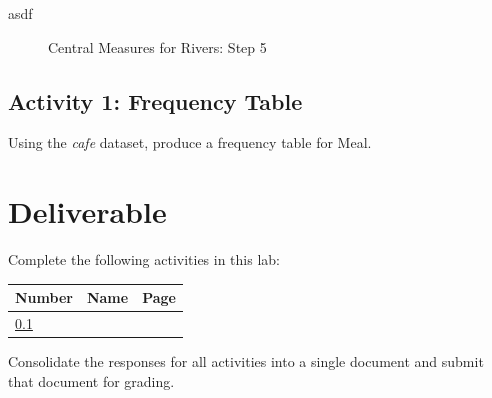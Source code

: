   asdf

\begin{figure}[H]
  \begin{center}
    \caption{Central Measures for Rivers: Step 5}
    \label{lab02_fig02}
  \end{center}
\end{figure}

\subsection{Activity 1: Frequency Table} \label{lab02_act01}

Using the \textit{cafe} dataset, produce a frequency table for Meal.


\section{Deliverable}

Complete the following activities in this lab:

\begin{center}
  \begin{tabular}{lll}
    \hline 
    \textbf{Number} & \textbf{Name} & \textbf{Page} \\ 
    \hline 
    \ref{lab02_act01} & \nameref{lab02_act01} & \pageref{lab02_act01} \\ 
    \hline 
  \end{tabular} 
\end{center}

Consolidate the responses for all activities into a single document and submit that document for grading.
